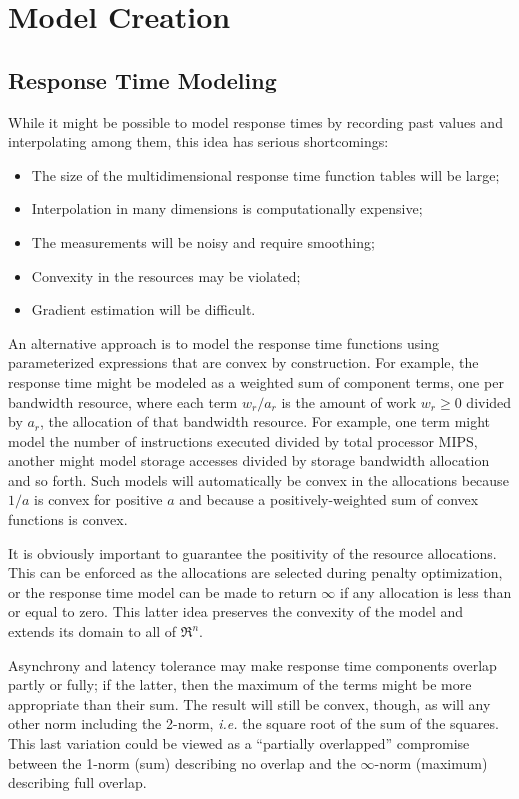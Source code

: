 \section{Model Creation}


\subsection*{Response Time Modeling}

While it might be possible to model response times by recording past values and interpolating among them,
this idea has serious shortcomings:
\begin{itemize}
\item The size of the multidimensional response time function tables will be large;
\item Interpolation in many dimensions is computationally expensive;
\item The measurements will be noisy and require smoothing;
\item Convexity in the resources may be violated;
\item Gradient estimation will be difficult.
\end{itemize}

An alternative approach is to model the response time functions using parameterized expressions that are convex by construction.
For example, the response time might be modeled as a weighted sum of component terms,
one per bandwidth resource, where each term $w_r/a_r$ is
the amount of work $w_r \geq 0$ divided by $a_r$, the allocation of that bandwidth resource\cite{Snav}.
For example,
one term might model the number of instructions executed divided by total processor MIPS,
another might model storage accesses divided by storage bandwidth allocation and so forth.
Such models will automatically be convex in the allocations because $1/a$ is convex for positive $a$
and because a positively-weighted sum of convex functions is convex.

It is obviously important to guarantee the positivity of the resource allocations.
This can be enforced as the allocations are selected during penalty optimization,
or the response time model can be made to return $\infty$ if any allocation is less than or equal to zero.
This latter idea preserves the convexity of the model and extends its domain to all of $\Re^n$.

Asynchrony and latency tolerance may make response time components overlap partly or fully;
if the latter, then the maximum of the terms might be more appropriate than their sum.
The result will still be convex, though, as will any other norm including the 2-norm,
\emph{i.e.} the square root of the sum of the squares.
This last variation could be viewed as a ``partially overlapped'' compromise between
the 1-norm (sum) describing no overlap and the $\infty$-norm (maximum) describing full overlap.

